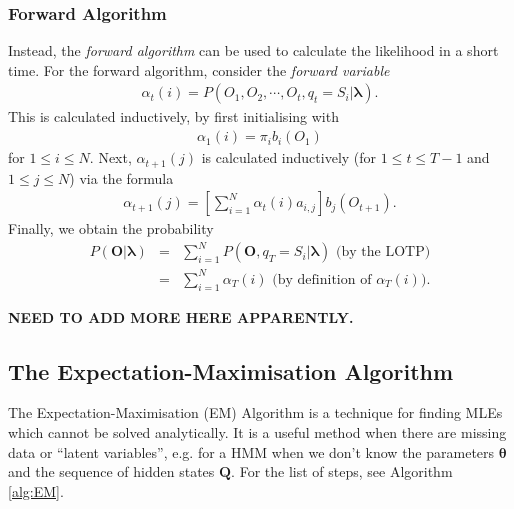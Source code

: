 \documentclass[12pt]{article}
\begin{document}
\subsubsection{Forward Algorithm}\label{sssec:for_back_alg}
Instead, the \emph{forward algorithm} can be used to calculate the likelihood in a short time. For the forward algorithm, consider the \emph{forward variable}
\begin{eqnarray}
  \alpha_t(i)=P(O_1,O_2,\cdots,O_t,q_t=S_i|\bm{\lambda}).
\end{eqnarray}
This is calculated inductively, by first initialising with
\begin{eqnarray}
  \alpha_1(i)=\pi_ib_i(O_1)
\end{eqnarray}
for $1\le i \le N$. Next, $\alpha_{t+1}(j)$ is calculated inductively (for $1\le t \le T-1$ and $1\le j \le N$) via the formula
\begin{eqnarray}
  \alpha_{t+1}(j)=\left[\sum_{i=1}^N\alpha_t(i)a_{i,j} \right]b_j(O_{t+1}).
\end{eqnarray}
Finally, we obtain the probability
\begin{eqnarray}
  P(\bm{O}|\bm{\lambda})&=&\sum_{i=1}^NP(\bm{O},q_T=S_i|\bm{\lambda})\text{ (by the LOTP)}  \nonumber \\
  &=&  \sum_{i=1}^N\alpha_T(i) \text{ (by definition of $\alpha_T(i)$)}.
\end{eqnarray}

\textbf{NEED TO ADD MORE HERE APPARENTLY.}





\subsection{The Expectation-Maximisation Algorithm}\label{ssec:EM-Alg}
The Expectation-Maximisation (EM) Algorithm is a technique for finding MLEs which cannot be solved analytically. It is a useful method when there are missing data or ``latent variables'', e.g. for a HMM when we don't know the parameters $\bm{\theta}$ and the sequence of hidden states $\bm{Q}$. For the list of steps, see Algorithm \ref{alg:EM}.
\end{document}
